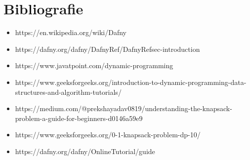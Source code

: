 \chapter*{Bibliografie} 
\begin{sloppypar}

\begin{itemize}
    \item https://en.wikipedia.org/wiki/Dafny
    \item https://dafny.org/dafny/DafnyRef/DafnyRef{\texthash}sec-introduction
    \item https://www.javatpoint.com/dynamic-programming
    \item https://www.geeksforgeeks.org/introduction-to-dynamic-programming-data-structures-and-algorithm-tutorials/
    \item https://medium.com/@prekshayadav0819/understanding-the-knapsack-problem-a-guide-for-beginners-d0146a59e9
    \item https://www.geeksforgeeks.org/0-1-knapsack-problem-dp-10/
    \item https://dafny.org/dafny/OnlineTutorial/guide
\end{itemize}
\end{sloppypar}